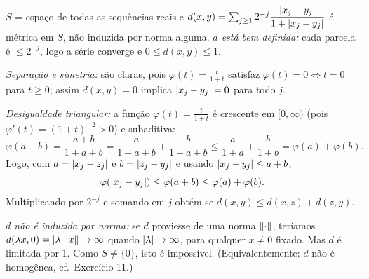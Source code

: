 \begin{exercicio}{$S$ = espaço de todas as sequências reais e $d(x,y)=\sum_{j\ge1}2^{-j}\dfrac{\lvert x_j-y_j\rvert}{1+\lvert x_j-y_j\rvert}$ é métrica em $S$, não induzida por norma alguma.}
\sol
\emph{$d$ está bem definida:} cada parcela é $\le 2^{-j}$, logo a série converge e $0\le d(x,y)\le 1$.

\emph{Separação e simetria:} são claras, pois $\varphi(t)=\frac{t}{1+t}$ satisfaz $\varphi(t)=0\iff t=0$ para $t \geq 0$; assim $d(x,y)=0$ implica $\lvert x_j-y_j\rvert=0$ para todo $j$.

\emph{Desigualdade triangular:} a função $\varphi(t)=\frac{t}{1+t}$ é crescente em $[0,\infty)$ (pois $\varphi'(t)=(1+t)^{-2}>0$) e subaditiva:
\[ \varphi(a+b)=\frac{a+b}{1+a+b}=\frac{a}{1+a+b}+\frac{b}{1+a+b}\le \frac{a}{1+a}+\frac{b}{1+b}=\varphi(a)+\varphi(b). \]
Logo, com $a=\lvert x_j-z_j\rvert$ e $b=\lvert z_j-y_j\rvert$ e usando $\lvert x_j-y_j\rvert\le a+b$,
\[ \varphi(\lvert x_j-y_j\rvert)\le\varphi(a+b)\le \varphi(a)+\varphi(b). \]
Multiplicando por $2^{-j}$ e somando em $j$ obtém-se $d(x,y)\le d(x,z)+d(z,y)$.

\emph{$d$ não é induzida por norma:} se $d$ proviesse de uma norma $\lVert\cdot\rVert$, teríamos $d(\lambda x,0)=\lvert\lambda\rvert\lVert x\rVert\to\infty$ quando $\lvert\lambda\rvert\to\infty$, para qualquer $x\neq 0$ fixado. Mas $d$ é limitada por $1$. Como $S\neq\{0\}$, isto é impossível. (Equivalentemente: $d$ não é homogênea, cf.\ Exercício 11.)
\end{exercicio}

